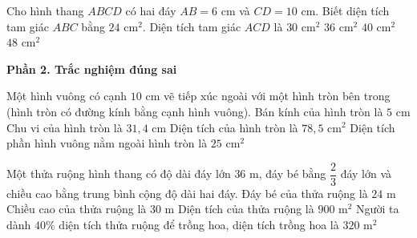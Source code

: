 \begin{ex} %
Cho hình thang $ABCD$ có hai đáy $AB = 6\text{ cm}$ và $CD = 10\text{ cm}$. Biết diện tích tam giác $ABC$ bằng $24\text{ cm}^2$. Diện tích tam giác $ACD$ là
\choice
{$30\text{ cm}^2$}
{$36\text{ cm}^2$}
{\True $40\text{ cm}^2$}
{$48\text{ cm}^2$}
\end{ex}

\textbf{Phần 2. Trắc nghiệm đúng sai}

\begin{ex} %
Một hình vuông có cạnh $10\text{ cm}$ vẽ tiếp xúc ngoài với một hình tròn bên trong (hình tròn có đường kính bằng cạnh hình vuông).
\choiceTF
{\True Bán kính của hình tròn là $5\text{ cm}$}
{\True Chu vi của hình tròn là $31{,}4\text{ cm}$}
{\True Diện tích của hình tròn là $78{,}5\text{ cm}^2$}
{Diện tích phần hình vuông nằm ngoài hình tròn là $25\text{ cm}^2$}
\end{ex}

\begin{ex} %
Một thửa ruộng hình thang có độ dài đáy lớn $36\text{ m}$, đáy bé bằng $\dfrac{2}{3}$ đáy lớn và chiều cao bằng trung bình cộng độ dài hai đáy.
\choiceTF
{\True Đáy bé của thửa ruộng là $24\text{ m}$}
{\True Chiều cao của thửa ruộng là $30\text{ m}$}
{\True Diện tích của thửa ruộng là $900\text{ m}^2$}
{Người ta dành $40\%$ diện tích thửa ruộng để trồng hoa, diện tích trồng hoa là $320\text{ m}^2$}
\end{ex}

